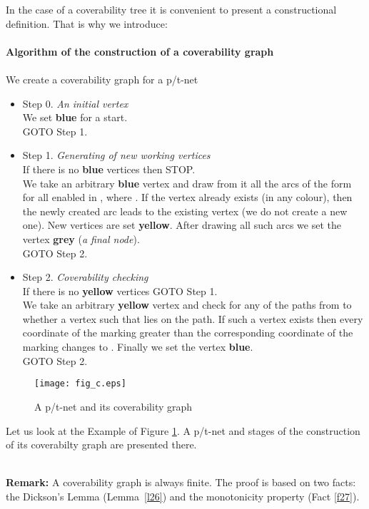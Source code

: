 \documentclass[a4paper]{llncs}
\begin{document}
In the case of a coverability tree it is convenient to present a constructional definition. That is why we introduce:
\\ \\
\textbf{Algorithm of the construction of a coverability graph}
\\ \\
We create a coverability graph for a p/t-net 
\begin{itemize}
\item Step 0. \textit{An initial vertex}\\
We set  \textbf{blue} for a start.\\
GOTO Step 1.\\ 
\item Step 1. \textit{Generating of new working vertices}\\
If there is no \textbf{blue} vertices then STOP.\\
We take an arbitrary \textbf{blue} vertex  and draw from it all the arcs of the form  for all  enabled in , where . If the vertex  already exists (in any colour), then the newly created arc leads to the existing vertex (we do not create a new one). New vertices are set \textbf{yellow}. After drawing all such arcs we set the vertex   \textbf{grey} (\textit{a final node}).\\
GOTO Step 2.\\ 
\item Step 2. \textit{Coverability checking}\\
If there is no \textbf{yellow} vertices GOTO Step 1.\\
We take an arbitrary \textbf{yellow} vertex  and check for any of the paths from  to  whether a vertex  such that  lies on the path. If such a vertex exists then every coordinate of the marking  greater than the corresponding coordinate of the marking  changes to . Finally we set the vertex  \textbf{blue}.\\
GOTO Step 2.\\ 
\end{itemize}
\begin{example}
\begin{figure}[h]
\centering
\texttt{[image: fig\_c.eps]}
\caption{A p/t-net and its coverability graph}
\label{FigC}
\end{figure}
\label{e_cov}
Let us look at the Example of Figure \ref{FigC}. A p/t-net and stages of the construction of its coverabilty graph are presented there.
\end{example}
\mbox{ }\\
\textbf{Remark:} A coverability graph is always finite. The proof is based on two facts: the Dickson's Lemma (Lemma~\ref{l26}) and the monotonicity property (Fact \ref{f27}).
\\ 
\end{document}
